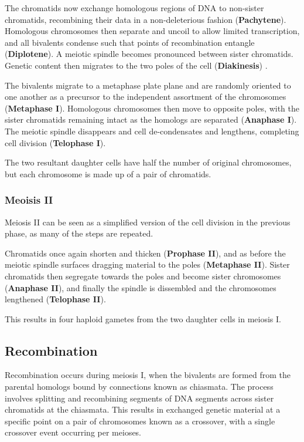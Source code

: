 The chromatids now exchange homologous regions of DNA to non-sister chromatids, recombining their data in a non-deleterious fashion (\textbf{Pachytene}).  Homologous chromosomes then separate and uncoil to allow limited transcription, and all bivalents condense such that points of recombination entangle (\textbf{Diplotene}). A \gls{meiotic spindle} becomes pronounced between sister chromatids. Genetic content then migrates to the two poles of the cell (\textbf{Diakinesis}) .

The bivalents migrate to a \gls{metaphase plate} plane and are randomly oriented to one another as a precursor to the independent assortment of the chromosomes (\textbf{Metaphase I}). Homologous chromosomes then move to opposite poles, with the sister chromatids remaining intact as the homologs are separated (\textbf{Anaphase I}).  The meiotic spindle disappears and cell de-condensates and lengthens, completing cell division (\textbf{Telophase I}). 

The two resultant daughter cells have half the number of original chromosomes, but each chromosome is made up of a pair of chromatids.


\subsubsection{Meoisis II}

Meiosis II can be seen as a simplified version of the cell division in the previous phase, as many of the steps are repeated.

Chromatids once again shorten and thicken (\textbf{Prophase II}), and as before the meiotic spindle surfaces dragging material to the poles (\textbf{Metaphase II}). Sister chromatids then segregate towards the poles and become sister chromosomes (\textbf{Anaphase II}), and finally the spindle is dissembled and the chromosomes lengthened (\textbf{Telophase II}).

This results in four haploid gametes from the two daughter cells in meiosis I. 

\subsection{Recombination}


Recombination occurs during meiosis I, when the bivalents are formed from the parental homologs bound by connections known as \gls{chiasmata}.  The process involves splitting and recombining segments of DNA segments across sister chromatids at the chiasmata. This results in exchanged genetic material at a specific point on a pair of chromosomes known as a \gls{crossover}, with a single crossover event occurring per meioses.

